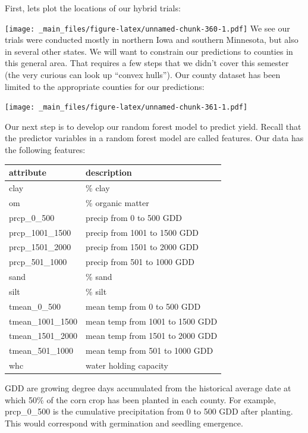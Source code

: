 \documentclass[
]{book}
\begin{document}
First, lets plot the locations of our hybrid trials:

\texttt{[image: \_main\_files/figure-latex/unnamed-chunk-360-1.pdf]}
We see our trials were conducted mostly in northern Iowa and southern Minnesota, but also in several other states. We will want to constrain our predictions to counties in this general area. That requires a few steps that we didn't cover this semester (the very curious can look up ``convex hulls''). Our county dataset has been limited to the appropriate counties for our predictions:

\texttt{[image: \_main\_files/figure-latex/unnamed-chunk-361-1.pdf]}

Our next step is to develop our random forest model to predict yield. Recall that the predictor variables in a random forest model are called features. Our data has the following features:

\begin{tabular}[t]{l|l}
\hline
attribute & description\\
\hline
clay & \% clay\\
\hline
om & \% organic matter\\
\hline
prcp\_0\_500 & precip from 0 to 500 GDD\\
\hline
prcp\_1001\_1500 & precip from 1001 to 1500 GDD\\
\hline
prcp\_1501\_2000 & precip from 1501 to 2000 GDD\\
\hline
prcp\_501\_1000 & precip from 501 to 1000 GDD\\
\hline
sand & \% sand\\
\hline
silt & \% silt\\
\hline
tmean\_0\_500 & mean temp from 0 to 500 GDD\\
\hline
tmean\_1001\_1500 & mean temp from 1001 to 1500 GDD\\
\hline
tmean\_1501\_2000 & mean temp from 1501 to 2000 GDD\\
\hline
tmean\_501\_1000 & mean temp from 501 to 1000 GDD\\
\hline
whc & water holding capacity\\
\hline
\end{tabular}

GDD are growing degree days accumulated from the historical average date at which 50\% of the corn crop has been planted in each county. For example, prcp\_0\_500 is the cumulative precipitation from 0 to 500 GDD after planting. This would correspond with germination and seedling emergence.
\end{document}
